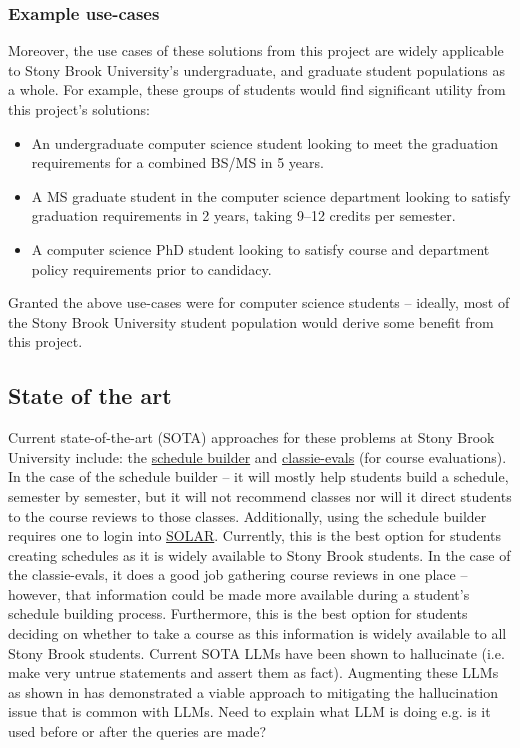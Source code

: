 \documentclass[12pt]{article}
\begin{document}
    \subsubsection{Example use-cases}
    \label{subsubsec:example}
    Moreover, the use cases of these solutions from this project are widely applicable to Stony Brook University's undergraduate, and graduate student populations as a whole. For example, these groups of students would find significant utility from this project's solutions:
    \begin{itemize}
        \item An undergraduate computer science student looking to meet the graduation requirements for a combined BS/MS in 5 years.
        \item A MS graduate student in the computer science department looking to satisfy graduation requirements in 2 years, taking 9--12 credits per semester.
        \item A computer science PhD student looking to satisfy course and department policy requirements prior to candidacy.
    \end{itemize}

    Granted the above use-cases were for computer science students -- ideally, most of the Stony Brook University student population would derive some benefit from this project.

    \subsection{State of the art}
    \label{subsec:sota}
    Current state-of-the-art (SOTA) approaches for these problems at Stony Brook University include: the \href{https://you.stonybrook.edu/uaamedia/schedulebuilder/}{schedule builder} and \href{https://classie-evals.stonybrook.edu/}{classie-evals} (for course evaluations). In the case of the schedule builder -- it will mostly help students build a schedule, semester by semester\cite{sched}, but it will not recommend classes nor will it direct students to the course reviews to those classes. Additionally, using the schedule builder requires one to login into \href{https://it.stonybrook.edu/services/solar}{SOLAR}\cite{sched}. Currently, this is the best option for students creating schedules as it is widely available to Stony Brook students.
    In the case of the classie-evals, it does a good job gathering course reviews in one place\cite{class} -- however, that information could be made more available during a student's schedule building process. Furthermore, this is the best option for students deciding on whether to take a course as this information is widely available to all Stony Brook students.
    Current SOTA LLMs \cite{alpaca,touvron2023llama,touvron2023llama2,ye2023gpt3.5} have been shown to hallucinate (i.e. make very untrue statements and assert them as fact). Augmenting these LLMs as shown in \cite{luo2024} has demonstrated a viable approach to mitigating the hallucination issue that is common with LLMs. {\color{red} Need to explain what LLM is doing e.g. is it used before or after the queries are made?}
\end{document}
